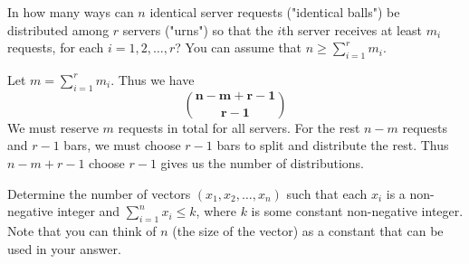 \documentclass[answers]{exam}
\begin{document}
\begin{questions}

	\begin{solution}
	\end{solution}
	
	\question In how many ways can $n$ identical server requests ("identical balls") be distributed among $r$ servers ("urns") so that the $i$th server receives at least $m_i$ requests, for each $i = 1, 2, \dots, r$? You can assume that $n \geq \sum_{i=1}^r m_i$.
	
	\begin{solution}
	Let $m = \sum_{i=1}^r m_i$. Thus we have 
	\[\bm{{n - m + r - 1 \choose r - 1}}\]
	We must reserve $m$ requests in total for all servers. For the rest $n - m$ requests and $r - 1$ bars, we must choose $r - 1$ bars to split and distribute the rest. Thus $n - m + r - 1$ choose $r - 1$ gives us the number of distributions.
	\end{solution}
	
	\question Determine the number of vectors $(x_1, x_2, \dots, x_n)$ such that each $x_i$ is a non-negative integer and $\sum_{i=1}^n x_i \leq k$, where $k$ is some constant non-negative integer. Note that you can think of $n$ (the size of the vector) as a constant that can be used in your answer.
	

\end{questions}
\end{document}

